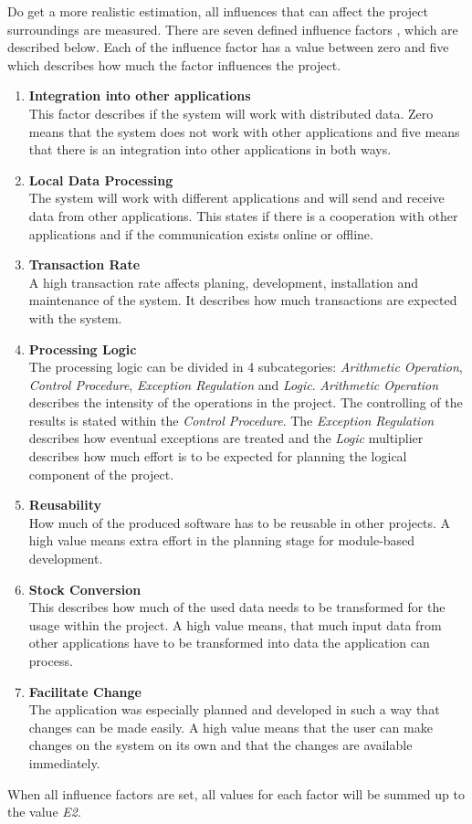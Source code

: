Do get a more realistic estimation, all influences that can affect the project surroundings are measured. There are seven defined influence factors \cite{Softwaremanagement}, which are described below. Each of the influence factor has a value between zero and five which describes how much the factor influences the project.\\

\begin{enumerate}
	\item \textbf{Integration into other applications}\\This factor describes if the system will work with distributed data. Zero means that the system does not work with other applications and five means that there is an integration into other applications in both ways.
	\item \textbf{Local Data Processing}\\The system will work with different applications and will send and receive data from other applications. This states if there is a cooperation with other applications and if the communication exists online or offline.
	\item \textbf{Transaction Rate}\\A high transaction rate affects planing, development, installation and maintenance of the system. It describes how much transactions are expected with the system.
	\item \textbf{Processing Logic}\\The processing logic can be divided in 4 subcategories: \textit{Arithmetic Operation}, \textit{Control Procedure}, \textit{Exception Regulation} and \textit{Logic}. \textit{Arithmetic Operation} describes the intensity of the operations in the project. The controlling of the results is stated within the \textit{Control Procedure}. The \textit{Exception Regulation} describes how eventual exceptions are treated and the \textit{Logic} multiplier describes how much effort is to be expected for planning the logical component of the project.
	\item \textbf{Reusability}\\ How much of the produced software has to be reusable in other projects. A high value means extra effort in the planning stage for module-based development.
	\item \textbf{Stock Conversion}\\ This describes how much of the used data needs to be transformed for the usage within the project. A high value means, that much input data from other applications have to be transformed into data the application can process.
	\item \textbf{Facilitate Change}\\ The application was especially planned and developed in such a way that changes can be made easily. A high value means that the user can make changes on the system on its own and that the changes are available immediately.
\end{enumerate}
When all influence factors are set, all values for each factor will be summed up to the value \textit{E2}. 

